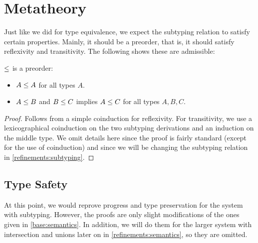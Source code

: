 
\section{Metatheory}

Just like we did for type equivalence, we expect the subtyping relation to satisfy certain properties. Mainly, it should be a preorder, that is, it should satisfy reflexivity and transitivity. The following  shows these are admissible:

\begin{theorem}
  \label{sub-is-preorder}
  $\le$ is a preorder:
  \begin{itemize}
    \item $A \le A$ for all types $A$.
    \item $A \le B$ and $B \le C$ implies $A \le C$ for all types $A, B, C$.
  \end{itemize}
\end{theorem}
\begin{proof}
  Follows from a simple coinduction for reflexivity. For transitivity, we use a lexicographical coinduction on the two subtyping derivations and an induction on the middle type. We omit details here since the proof is fairly standard (except for the use of coinduction) and since we will be changing the subtyping relation in \cref{refinements:subtyping}.
\end{proof}


\subsection{Type Safety}

At this point, we would reprove progress and type preservation for the system with subtyping. However, the proofs are only slight modifications of the ones given in \cref{base:semantics}. In addition, we will do them for the larger system with intersection and unions later on in \cref{refinements:semantics}, so they are omitted.

